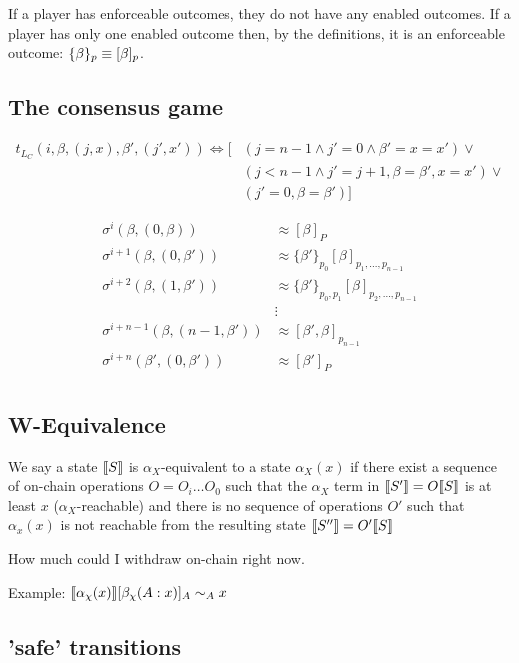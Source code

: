 If a player has enforceable outcomes, they do not have any enabled outcomes.
If a player has only one enabled outcome then, by the definitions, it is an enforceable outcome: $\{\beta \}_p \equiv [\beta]_p$. 


\subsection{The consensus game}

  \begin{align*}
    t_{L_C}(i, \beta, (j, x), \beta', (j', x')) \Leftrightarrow
      [ & (j=n-1 \wedge j'= 0 \wedge \beta' = x = x')  \vee \\
      & (j < n-1 \wedge j' = j+1, \beta = \beta', x = x') \vee \\
      & (j'=0, \beta = \beta') ]
  \end{align*}

  \begin{align*}
    \sigma^{i}(\beta, (0, \beta)) & \approx [\beta]_P \\
    \sigma^{i+1}(\beta, (0, \beta')) & \approx \{\beta'\}_{p_0}[\beta]_{p_1, ..., p_{n-1}} \\
    \sigma^{i+2}(\beta, (1, \beta')) & \approx \{\beta'\}_{p_0, p_1}[\beta]_{p_2, ..., p_{n-1}} \\
    &\vdots\\
    \sigma^{i+n-1}(\beta, (n-1, \beta')) & \approx [\beta', \beta]_{p_{n-1}} \\
    \sigma^{i+n}(\beta', (0, \beta')) & \approx [\beta']_{P} \\
  \end{align*}

\subsection{W-Equivalence}

We say a state $\llbracket S \rrbracket$ is $\alpha_X$-equivalent to a state $\alpha_X(x)$ if there exist
a sequence of on-chain operations $O = O_i \dots O_0$ such that the $\alpha_X$ term in
$\llbracket S' \rrbracket = O\llbracket S \rrbracket$ is at least $x$ ($\alpha_X$-reachable) and there is no sequence of
operations $O'$ such that $\alpha_x(x)$ is not reachable from the resulting state
$\llbracket S'' \rrbracket = O'\llbracket S \rrbracket$ 

How much could I withdraw on-chain right now.

Example: $\llbracket \alpha_\chi(x) \rrbracket[\beta_\chi(A: x)]_A \sim_A x$

\subsection{'safe' transitions}

